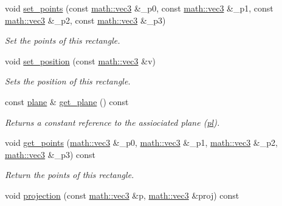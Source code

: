 \begin{DoxyCompactItemize}
void \hyperlink{classphysim_1_1geometry_1_1rectangle_ab23dc9b9e524906709db6b82bc8e5cf9}{set\+\_\+points} (const \hyperlink{structphysim_1_1math_1_1vec3}{math\+::vec3} \&\+\_\+p0, const \hyperlink{structphysim_1_1math_1_1vec3}{math\+::vec3} \&\+\_\+p1, const \hyperlink{structphysim_1_1math_1_1vec3}{math\+::vec3} \&\+\_\+p2, const \hyperlink{structphysim_1_1math_1_1vec3}{math\+::vec3} \&\+\_\+p3)
\begin{DoxyCompactList}\small\item\em Set the points of this rectangle. \end{DoxyCompactList}\item 
void \hyperlink{classphysim_1_1geometry_1_1rectangle_acb53f7b6b466f152087847bc8527245a}{set\+\_\+position} (const \hyperlink{structphysim_1_1math_1_1vec3}{math\+::vec3} \&v)
\begin{DoxyCompactList}\small\item\em Sets the position of this rectangle. \end{DoxyCompactList}\item 
\mbox{\label{classphysim_1_1geometry_1_1rectangle_afb936712fb4b974cdeb1b2dbb7eb8d0d}} 
const \hyperlink{classphysim_1_1geometry_1_1plane}{plane} \& \hyperlink{classphysim_1_1geometry_1_1rectangle_afb936712fb4b974cdeb1b2dbb7eb8d0d}{get\+\_\+plane} () const
\begin{DoxyCompactList}\small\item\em Returns a constant reference to the assiociated plane (\hyperlink{classphysim_1_1geometry_1_1rectangle_ae31596ec13141a7dee676786f724f6e5}{pl}). \end{DoxyCompactList}\item 
void \hyperlink{classphysim_1_1geometry_1_1rectangle_a80175e242bff969131b81d671e339df9}{get\+\_\+points} (\hyperlink{structphysim_1_1math_1_1vec3}{math\+::vec3} \&\+\_\+p0, \hyperlink{structphysim_1_1math_1_1vec3}{math\+::vec3} \&\+\_\+p1, \hyperlink{structphysim_1_1math_1_1vec3}{math\+::vec3} \&\+\_\+p2, \hyperlink{structphysim_1_1math_1_1vec3}{math\+::vec3} \&\+\_\+p3) const
\begin{DoxyCompactList}\small\item\em Return the points of this rectangle. \end{DoxyCompactList}\item 
void \hyperlink{classphysim_1_1geometry_1_1rectangle_a4875012aa1b9c510e23b62f090acac23}{projection} (const \hyperlink{structphysim_1_1math_1_1vec3}{math\+::vec3} \&p, \hyperlink{structphysim_1_1math_1_1vec3}{math\+::vec3} \&proj) const

\end{DoxyCompactItemize}
